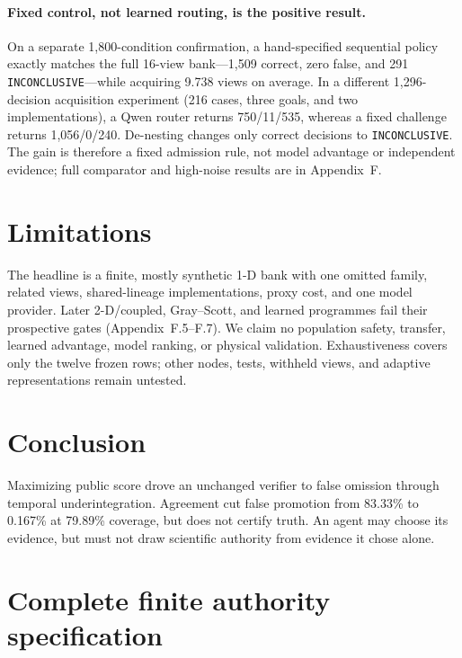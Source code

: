 \documentclass{article}
\newcommand{\INC}{\texttt{INCONCLUSIVE}\xspace}
\begin{document}
\paragraph{Fixed control, not learned routing, is the positive result.}
On a separate 1,800-condition confirmation, a hand-specified sequential policy exactly matches the
full 16-view bank---1,509 correct, zero false, and 291 \INC---while acquiring 9.738 views on average.
In a different 1,296-decision acquisition experiment (216 cases, three goals, and two implementations),
a Qwen router returns 750/11/535, whereas a fixed challenge returns 1,056/0/240. De-nesting changes
only correct decisions to \INC. The gain is therefore a fixed admission rule, not model advantage or
independent evidence; full comparator and high-noise results are in Appendix~F.

\section{Limitations}

The headline is a finite, mostly synthetic 1-D bank with one omitted family, related views,
shared-lineage implementations, proxy cost, and one model provider. Later 2-D/coupled, Gray--Scott,
and learned programmes fail their prospective gates (Appendix~F.5--F.7). We claim no population
safety, transfer, learned advantage, model ranking, or physical validation. Exhaustiveness covers
only the twelve frozen rows; other nodes, tests, withheld views, and adaptive representations remain
untested.

\section{Conclusion}

Maximizing public score drove an unchanged verifier to false omission through temporal
underintegration. Agreement cut false promotion from 83.33\% to 0.167\% at 79.89\% coverage, but
does not certify truth. An agent may choose its evidence, but must not draw scientific authority
from evidence it chose alone.

\clearpage
\begingroup
\small


\endgroup



\clearpage
\appendix
\section{Complete finite authority specification}
\end{document}

